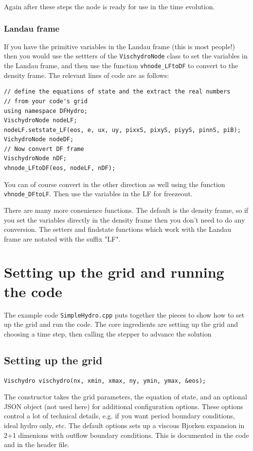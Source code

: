 \documentclass[12pt]{article}
\begin{document}
Again after these steps the node is ready for use in the time evolution. 


\subsubsection{Landau frame}
If you have the primitive variables in the Landau frame (this is most people!) then 
you would use the settters of the {\tt VischydroNode} class to set the variables in the Landau frame, and then use the function \texttt{vhnode_LFtoDF} to convert to the density frame.  The relevant lines of code are as follows:
\begin{verbatim}
// define the equations of state and the extract the real numbers 
// from your code's grid 
using namespace DFHydro;
VischydroNode nodeLF;
nodeLF.setstate_LF(eos, e, ux, uy, pixxS, pixyS, piyyS, pinnS, piB);
VichydroNode nodeDF;
// Now convert DF frame
VischydroNode nDF;
vhnode_LFtoDF(eos, nodeLF, nDF);
\end{verbatim}
You can of course convert in the other direction as well using the function
\texttt{vhnode_DFtoLF}.  Then use the variables in the LF for freezeout. 


There are many more conenience functions. The default is the density frame, so if you set the variables directly in the density frame then you don't need to do any conversion. The setters and findstate functions which work with the Landau frame are notated with the suffix "LF".

\section{Setting up the grid and running the code}

The example code {\tt SimpleHydro.cpp} puts together the pieces to show how to set up the grid and run the code.  The core ingredients are setting up the grid and choosing a time step, then calling the stepper to advance the solution 

\subsection{Setting up the grid}

\begin{verbatim}
Vischydro vischydro(nx, xmin, xmax, ny, ymin, ymax, &eos);
\end{verbatim}
The constructor takes the grid parameters, the equation of state, and an optional JSON object (not used here) for additional configuration options. 
These options control a lot of technical details, e.g. if you want period
boundary conditions, ideal hydro only, etc.  The default options sets up a
viscous Bjorken expansion in 2+1 dimenions with outflow boundary conditions.
This is documented in the code and in the header file.  
\end{document}
